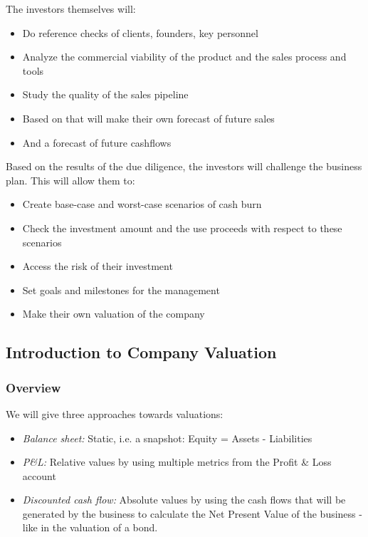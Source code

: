 \documentclass[a4paper]{extarticle}
\begin{document}
The investors themselves will:

\begin{itemize}
    \item Do reference checks of clients, founders, key personnel
    \item Analyze the commercial viability of the product and the sales process and tools
    \item Study the quality of the sales pipeline
    \item Based on that will make their own forecast of future sales
    \item And a forecast of future cashflows
\end{itemize}

Based on the results of the due diligence, the investors will challenge the business plan. This will allow them to:

\begin{itemize}
    \item Create base-case and worst-case scenarios of cash burn
    \item Check the investment amount and the use proceeds with respect to these scenarios
    \item Access the risk of their investment
    \item Set goals and milestones for the management
    \item Make their own valuation of the company
\end{itemize}

\subsection{Introduction to Company Valuation}

\subsubsection{Overview}

We will give three approaches towards valuations:

\begin{itemize}
    \item \textit{Balance sheet:} Static, i.e. a snapshot: Equity = Assets - Liabilities
    \item \textit{P\&L:} Relative values by using multiple metrics from the Profit \& Loss account
    \item \textit{Discounted cash flow:} Absolute values by using the cash flows that will be generated by the business to calculate the Net Present Value of the business - like in the valuation of a bond.
\end{itemize}
\end{document}
